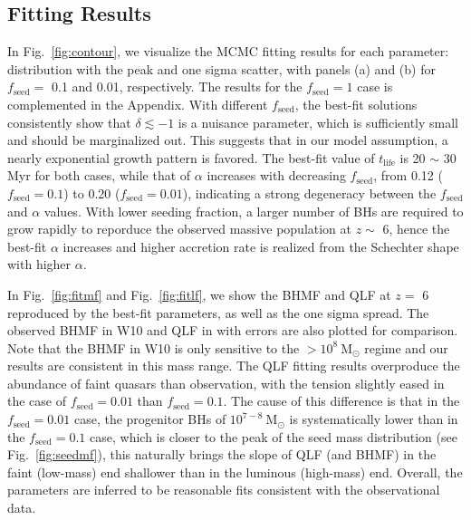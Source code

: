 \documentclass[nolinenumbers,preprint2,tighten]{aastex631}
\newcommand{\Msun}{\mathrm{M_\odot}}
\newcommand{\tlife}{t_\mathrm{life}}
\newcommand{\fseed}{f_\mathrm{seed}}
\begin{document}
\begin{CJK*}{UTF8}{gbsn}
\vspace{2mm}
\subsection{Fitting Results}\label{sec:fitting_result}
In Fig.~\ref{fig:contour}, we visualize the MCMC fitting results for each parameter: distribution with the peak and one sigma scatter, 
with panels (a) and (b) for $\fseed=$ 0.1 and 0.01, respectively. 
The results for the $\fseed=1$ case is complemented in the Appendix.
With different $\fseed$, the best-fit solutions consistently show that $\delta \lesssim -1$ is a nuisance parameter, 
which is sufficiently small and should be marginalized out. This suggests that in our model assumption, 
a nearly exponential growth pattern is favored. 
The best-fit value of $\tlife$ is 20 $\sim$ 30 Myr for both cases, 
while that of $\alpha$ increases with decreasing $\fseed$, 
from 0.12 ($\fseed=0.1$) to 0.20 ($\fseed=0.01$),
indicating a strong degeneracy between the $\fseed$ and $\alpha$ values. 
With lower seeding fraction, a larger number of BHs are required to grow rapidly to reporduce the observed massive population at $z\sim$ 6, 
hence the best-fit $\alpha$ increases and higher accretion rate is realized from the Schechter shape with higher $\alpha$. 

In Fig.~\ref{fig:fitmf} and Fig.~\ref{fig:fitlf}, we show the BHMF and QLF at $z=$ 6 reproduced by the best-fit parameters, 
as well as the one sigma spread. 
The observed BHMF in W10 and QLF in \citet{2018ApJ...869..150M} with errors are also plotted for comparison.
Note that the BHMF in W10 is only sensitive to the $>10^8~\Msun$ regime and our results are consistent in this mass range.
The QLF fitting results overproduce the abundance of faint quasars than observation, 
with the tension slightly eased in the case of $\fseed=0.01$ than $\fseed=0.1$. 
The cause of this difference is that in the $\fseed=0.01$ case, 
the progenitor BHs of $10^{7-8}~\Msun$ is systematically lower than in the $\fseed=0.1$ case, 
which is closer to the peak of the seed mass distribution (see Fig.~\ref{fig:seedmf}), 
this naturally brings the slope of QLF (and BHMF) in the faint (low-mass) end shallower than in the luminous (high-mass) end.
Overall, the parameters are inferred to be reasonable fits consistent with the observational data.


\end{CJK*}
\end{document}
